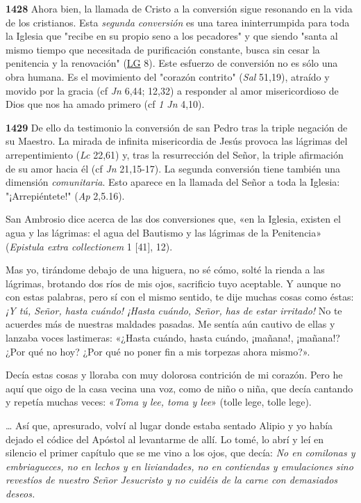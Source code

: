 \documentclass[]{article}
\begin{document}
\textbf{1428} Ahora bien, la llamada de Cristo a la conversión sigue
resonando en la vida de los cristianos. Esta \emph{segunda conversión}
es una tarea ininterrumpida para toda la Iglesia que "recibe en su
propio seno a los pecadores" y que siendo "santa al mismo tiempo que
necesitada de purificación constante, busca sin cesar la penitencia y la
renovación"
(\href{http://www.vatican.va/archive/hist_councils/ii_vatican_council/documents/vat-ii_const_19641121_lumen-gentium_sp.html}{LG}
8). Este esfuerzo de conversión no es sólo una obra humana. Es el
movimiento del "corazón contrito" (\emph{Sal} 51,19), atraído y movido
por la gracia (cf \emph{Jn} 6,44; 12,32) a responder al amor
misericordioso de Dios que nos ha amado primero (cf \emph{1 Jn} 4,10).

\textbf{1429} De ello da testimonio la conversión de san Pedro tras la
triple negación de su Maestro. La mirada de infinita misericordia de
Jesús provoca las lágrimas del arrepentimiento (\emph{Lc} 22,61) y, tras
la resurrección del Señor, la triple afirmación de su amor hacia él (cf
\emph{Jn} 21,15-17). La segunda conversión tiene también una dimensión
\emph{comunitaria}. Esto aparece en la llamada del Señor a toda la
Iglesia: "¡Arrepiéntete!" (\emph{Ap} 2,5.16).

San Ambrosio dice acerca de las dos conversiones que, «en la Iglesia,
existen el agua y las lágrimas: el agua del Bautismo y las lágrimas de
la Penitencia» (\emph{Epistula extra collectionem} 1 {[}41{]}, 12).

Mas yo, tirándome debajo de una higuera, no sé cómo, solté la rienda a
las lágrimas, brotando dos ríos de mis ojos, sacrificio tuyo aceptable.
Y aunque no con estas palabras, pero sí con el mismo sentido, te dije
muchas cosas como éstas: \emph{¡Y tú, Señor, hasta cuándo! ¡Hasta
cuándo, Señor, has de estar irritado!} No te acuerdes más de nuestras
maldades pasadas. Me sentía aún cautivo de ellas y lanzaba voces
lastimeras: «¿Hasta cuándo, hasta cuándo, ¡mañana!, ¡mañana!? ¿Por qué
no hoy? ¿Por qué no poner fin a mis torpezas ahora mismo?».

Decía estas cosas y lloraba con muy dolorosa contrición de mi corazón.
Pero he aquí que oigo de la casa vecina una voz, como de niño o niña,
que decía cantando y repetía muchas veces: «\emph{Toma y lee, toma y
lee}» (tolle lege, tolle lege).

\ldots{} Así que, apresurado, volví al lugar donde estaba sentado Alipio
y yo había dejado el códice del Apóstol al levantarme de allí. Lo tomé,
lo abrí y leí en silencio el primer capítulo que se me vino a los ojos,
que decía: \emph{No en comilonas y embriagueces, no en lechos y en
liviandades, no en contiendas y emulaciones sino revestíos de nuestro
Señor Jesucristo y no cuidéis de la carne con demasiados deseos.}
\end{document}
